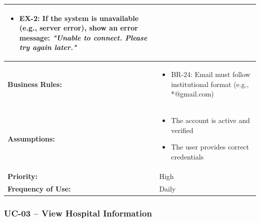 \documentclass[12pt,a4paper]{article}
\begin{document}
\begin{longtable}{|p{4.5cm}|p{10.5cm}|}
\begin{itemize}
  \item EX-2: If the system is unavailable (e.g., server error), show an error message: \textit{"Unable to connect. Please try again later."}
\end{itemize} \\
\hline
\textbf{Business Rules:} &
\begin{itemize}
  \item BR-24: Email must follow institutional format (e.g., *@gmail.com)
\end{itemize} \\
\hline
\textbf{Assumptions:} &
\begin{itemize}
  \item The account is active and verified
  \item The user provides correct credentials
\end{itemize} \\
\hline
\textbf{Priority:} & High \\
\hline
\textbf{Frequency of Use:} & Daily \\
\hline
\end{longtable}

\subsubsection{UC-03 – View Hospital Information}
\end{document}
